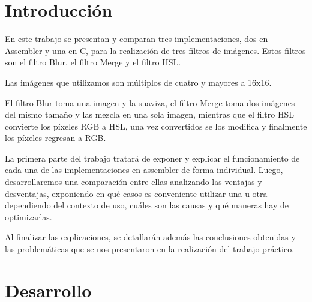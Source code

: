\documentclass[a4paper]{article}
\begin{document}
\thispagestyle{empty}

\maketitle
\newpage

\thispagestyle{empty}
\vfill

\thispagestyle{empty}
\vspace{3cm}
\tableofcontents
\newpage

\newpage

\section{Introducción}

En este trabajo se presentan y comparan tres implementaciones, dos en Assembler y una en C,  para la realización de tres filtros de imágenes. Estos filtros son el filtro Blur, el filtro Merge y el filtro HSL.

Las imágenes que utilizamos son múltiplos de cuatro y mayores a 16x16.

El filtro Blur toma una imagen y la suaviza, el filtro Merge toma dos imágenes del mismo tamaño y las mezcla en una sola imagen, mientras que el filtro HSL convierte los píxeles RGB a HSL, una vez convertidos se los modifica y finalmente los píxeles regresan a RGB. 

La primera parte del trabajo tratará de exponer y explicar el funcionamiento de cada una de las implementaciones en assembler de forma individual. Luego, desarrollaremos una comparación entre ellas analizando las ventajas y desventajas, exponiendo en qué casos es conveniente utilizar una u otra dependiendo del contexto de uso, cuáles son las causas y qué maneras hay de optimizarlas.

Al finalizar las explicaciones, se detallarán además las conclusiones obtenidas y las problemáticas que se nos presentaron  en la realización del trabajo práctico.

\newpage

\section{Desarrollo} 
\end{document}
